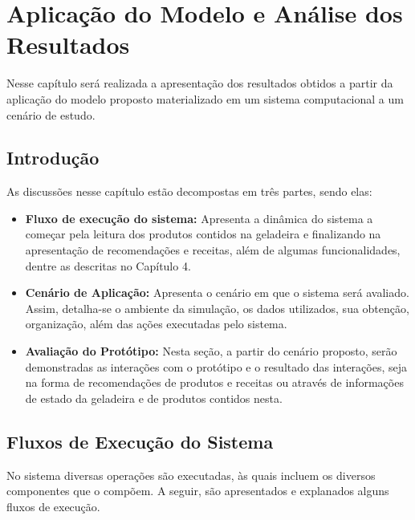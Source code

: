 \chapter{Aplicação do Modelo e Análise dos Resultados}
\label{cap:avaliacao_sistema}

Nesse capítulo será realizada a apresentação dos resultados obtidos a partir da aplicação do modelo proposto materializado em um sistema computacional a um cenário de estudo.

\section{Introdução}

As discussões nesse capítulo estão decompostas em três partes, sendo elas:

\begin{itemize}[noitemsep,topsep=5pt]
    \item \textbf{Fluxo de execução do sistema:} Apresenta a dinâmica do sistema a começar pela leitura dos produtos contidos na geladeira e finalizando na apresentação de recomendações e receitas, além de algumas funcionalidades, dentre as descritas no Capítulo 4.
    \item \textbf{Cenário de Aplicação:} Apresenta o cenário em que o sistema será avaliado. Assim, detalha-se o ambiente da simulação, os dados utilizados, sua obtenção, organização, além das ações executadas pelo sistema.
    \item \textbf{Avaliação do Protótipo:} Nesta seção, a partir do cenário proposto, serão demonstradas as interações com o protótipo e o resultado das interações, seja na forma de recomendações de produtos e receitas ou através de informações de estado da geladeira e de produtos contidos nesta.
\end{itemize}

\section{Fluxos de Execução do Sistema} \label{sec:fluxos-de-execucao}

No sistema diversas operações são executadas, às quais incluem os diversos componentes que o compõem. A seguir, são apresentados e explanados alguns fluxos de execução.

